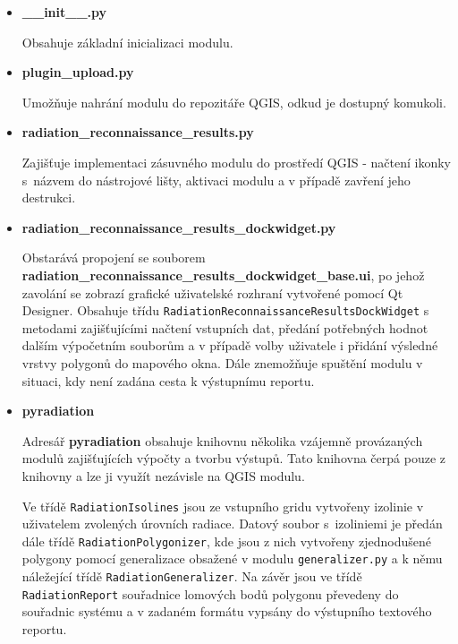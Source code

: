 \begin{itemize}
	\item \textbf{\_\_init\_\_.py} 
	
	Obsahuje základní inicializaci modulu.
		
	\item \textbf{plugin\_upload.py} 

          Umožňuje nahrání modulu do repozitáře QGIS, odkud je
          dostupný komukoli.

	\item \textbf{radiation\_reconnaissance\_results.py} 
	
          Zajišťuje implementaci zásuvného modulu do prostředí QGIS -
          načtení ikonky s~názvem do nástrojové lišty, aktivaci modulu
          a v případě zavření jeho destrukci.

	\item \textbf{radiation\_reconnaissance\_results\_dockwidget.py}
	
          Obstarává propojení se souborem\\
          \textbf{radiation\_reconnaissance\_results\_dockwidget\_base.ui},
          po jehož zavolání se zobrazí grafické uživatelské rozhraní
          vytvořené pomocí Qt Designer. Obsahuje třídu
          \texttt{RadiationReconnaissanceResultsDockWidget} s metodami
          zajišťujícími načtení vstupních dat, předání potřebných
          hodnot dalším výpočetním souborům a v případě volby
          uživatele i přidání výsledné vrstvy polygonů do mapového
          okna. Dále znemožňuje spuštění modulu v situaci, kdy není
          zadána cesta k výstupnímu reportu.

	\item \textbf{pyradiation}

          Adresář \textbf{pyradiation} obsahuje knihovnu několika 
          vzájemně provázaných modulů zajišťujících výpočty a tvorbu
          výstupů. Tato knihovna čerpá pouze z knihovny  a 
          lze ji využít nezávisle na QGIS modulu.

          Ve třídě \texttt{RadiationIsolines} jsou ze vstupního
          gridu vytvořeny izolinie v uživatelem zvolených úrovních
          radiace. Datový soubor s~izoliniemi je předán dále třídě
          \texttt{RadiationPolygonizer}, kde jsou z nich vytvořeny
          zjednodušené polygony pomocí generalizace obsažené v modulu
          \texttt{generalizer.py} a k němu náležející třídě
          \texttt{RadiationGeneralizer}. Na závěr jsou ve třídě \texttt{RadiationReport}
          souřadnice lomových bodů polygonu převedeny do souřadnic
          systému  a v zadaném formátu vypsány do výstupního
          textového reportu.
	
\end{itemize}

